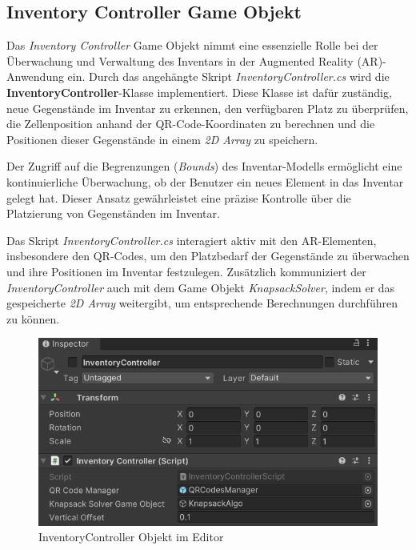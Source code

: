 \subsection{Inventory Controller Game Objekt}
Das \textit{Inventory Controller} Game Objekt nimmt eine essenzielle Rolle bei der Überwachung und Verwaltung des Inventars
in der Augmented Reality (AR)-Anwendung ein. Durch das angehängte Skript \textit{InventoryController.cs} wird die
\textbf{InventoryController}-Klasse implementiert. Diese Klasse ist dafür zuständig, neue Gegenstände im Inventar zu
erkennen, den verfügbaren Platz zu überprüfen, die Zellenposition anhand der QR-Code-Koordinaten zu berechnen und die
Positionen dieser Gegenstände in einem \textit{2D Array} zu speichern.

Der Zugriff auf die Begrenzungen (\textit{Bounds}) des Inventar-Modells ermöglicht eine kontinuierliche Überwachung, ob
der Benutzer ein neues Element in das Inventar gelegt hat. Dieser Ansatz gewährleistet eine präzise Kontrolle über die
Platzierung von Gegenständen im Inventar.

Das Skript \textit{InventoryController.cs} interagiert aktiv mit den AR-Elementen, insbesondere den QR-Codes, um den
Platzbedarf der Gegenstände zu überwachen und ihre Positionen im Inventar festzulegen. Zusätzlich kommuniziert der
\textit{InventoryController} auch mit dem Game Objekt \textit{KnapsackSolver}, indem er das gespeicherte \textit{2D Array}
weitergibt, um entsprechende Berechnungen durchführen zu können.

\begin{figure}[h]
\centering
\includegraphics[scale=0.8]{images/invCon_Editor}
\caption{InventoryController Objekt im Editor}
\label{fig:InventoryController_Editor}
\end{figure}


